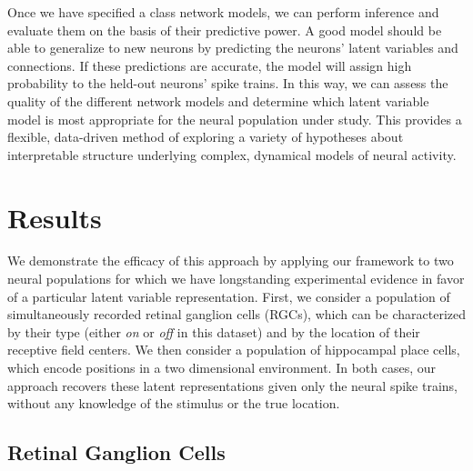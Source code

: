 Once we have specified a class network models, we can perform inference and 
evaluate them on the basis of their predictive power. A good model should 
be able to generalize to new neurons by predicting the neurons' latent 
variables and connections. If these predictions are accurate, the model 
will assign high probability to the held-out neurons' spike trains. 
In this way, we can assess the quality of the different network models
and determine which latent variable model is most appropriate for the 
neural population under study. This provides a flexible, data-driven 
method of exploring a variety of hypotheses about interpretable structure 
underlying complex, dynamical models of neural activity.


\section{Results}
We demonstrate the efficacy of this approach by applying our framework 
to two neural populations for which we have longstanding experimental 
evidence in favor of a particular latent variable representation.
First, we consider a population of simultaneously recorded retinal 
ganglion cells (RGCs), which can be characterized by their type 
(either \textit{on} or \textit{off} in this dataset) and
by the location of their receptive field centers. 
We then consider a population of hippocampal place cells, which encode 
positions in a two dimensional environment. In both cases, our approach 
recovers these latent representations given only the neural spike trains,
without any knowledge of the stimulus or the true location.

\subsection{Retinal Ganglion Cells}

